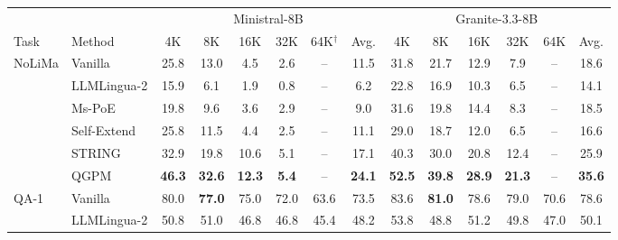 \documentclass[11pt]{article}
\begin{document}
\begin{table}[t]
\centering
\small
\setlength{\tabcolsep}{3pt}
\begin{tabular*}{\textwidth}{@{\extracolsep{\fill}} ll cccccc @{\hspace{10pt}} cccccc @{}}
\toprule
 & & \multicolumn{6}{c}{Ministral-8B} & \multicolumn{6}{c}{Granite-3.3-8B} \\
\cmidrule(lr){3-8} \cmidrule(l){9-14}
Task & Method & 4K & 8K & 16K & 32K & 64K$^{\dagger}$ & Avg. & 4K & 8K & 16K & 32K & 64K & Avg. \\
\midrule
\multirow{6}{*}{NoLiMa} & Vanilla & \phantom{0}25.8 & \phantom{0}13.0 & \phantom{00}4.5 & \phantom{00}2.6 & -- & \phantom{0}11.5 & \phantom{0}31.8 & \phantom{0}21.7 & \phantom{0}12.9 & \phantom{00}7.9 & -- & \phantom{0}18.6 \\
 & LLMLingua-2 & \phantom{0}15.9 & \phantom{00}6.1 & \phantom{00}1.9 & \phantom{00}0.8 & -- & \phantom{00}6.2 & \phantom{0}22.8 & \phantom{0}16.9 & \phantom{0}10.3 & \phantom{00}6.5 & -- & \phantom{0}14.1 \\
 & Ms-PoE & \phantom{0}19.8 & \phantom{00}9.6 & \phantom{00}3.6 & \phantom{00}2.9 & -- & \phantom{00}9.0 & \phantom{0}31.6 & \phantom{0}19.8 & \phantom{0}14.4 & \phantom{00}8.3 & -- & \phantom{0}18.5 \\
 & Self-Extend & \phantom{0}25.8 & \phantom{0}11.5 & \phantom{00}4.4 & \phantom{00}2.5 & -- & \phantom{0}11.1 & \phantom{0}29.0 & \phantom{0}18.7 & \phantom{0}12.0 & \phantom{00}6.5 & -- & \phantom{0}16.6 \\
 & STRING & \phantom{0}32.9 & \phantom{0}19.8 & \phantom{0}10.6 & \phantom{00}5.1 & -- & \phantom{0}17.1 & \phantom{0}40.3 & \phantom{0}30.0 & \phantom{0}20.8 & \phantom{0}12.4 & -- & \phantom{0}25.9 \\
 & QGPM & \textbf{\phantom{0}46.3} & \textbf{\phantom{0}32.6} & \textbf{\phantom{0}12.3} & \textbf{\phantom{00}5.4} & -- & \textbf{\phantom{0}24.1} & \textbf{\phantom{0}52.5} & \textbf{\phantom{0}39.8} & \textbf{\phantom{0}28.9} & \textbf{\phantom{0}21.3} & -- & \textbf{\phantom{0}35.6} \\
\midrule
\multirow{6}{*}{QA-1} & Vanilla & \phantom{0}80.0 & \textbf{\phantom{0}77.0} & \phantom{0}75.0 & \phantom{0}72.0 & \phantom{0}63.6 & \phantom{0}73.5 & \phantom{0}83.6 & \textbf{\phantom{0}81.0} & \phantom{0}78.6 & \phantom{0}79.0 & \phantom{0}70.6 & \phantom{0}78.6 \\
 & LLMLingua-2 & \phantom{0}50.8 & \phantom{0}51.0 & \phantom{0}46.8 & \phantom{0}46.8 & \phantom{0}45.4 & \phantom{0}48.2 & \phantom{0}53.8 & \phantom{0}48.8 & \phantom{0}51.2 & \phantom{0}49.8 & \phantom{0}47.0 & \phantom{0}50.1 \\

\end{tabular*}
\end{table}
\end{document}
